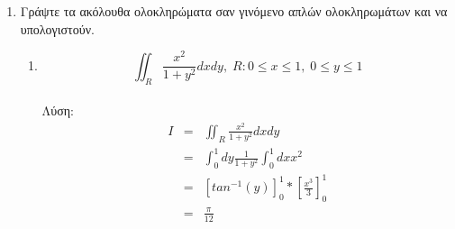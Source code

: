 \documentclass{article}
\begin{document}
{\begin{enumerate}
\begin{enumerate}{}
\item $$\iint _{R} xcos(x^2+y)dxdy,\;R:-\sqrt{\pi}\leq x\leq 0,\; 0\leq y \leq \pi$$ \\
Λύση:
\begin{eqnarray*}
I &=& \iint _{R} xcos(x^2+y) dxdy \\
& = & \int _{0} ^{\pi} dy \int_{-\sqrt{\pi}}^{0} dx xcos(x^2+y) \\
& = & \int _{0} ^{\pi} \left[ \frac{1}{2}sin(x^2+y) \right]^0_{-\sqrt{\pi}} dy\\
& = & \int _{0} ^{\pi} \frac{1}{2}sin(y)-\frac{1}{2}sin(\pi+y) dy\\
& = & \int _{0} ^{\pi} \frac{1}{2}sin(y)+\frac{1}{2}sin(y) dy\\
& = & \left[ -cos(y) \right]^{\pi}_{0}\\
& = & 2
\end{eqnarray*}

\item $$\iint _{R} x^2ye^{xy}dxdy,\;R:0\leq x\leq 1,\; 0\leq y \leq 2$$ \\
Λύση:
\begin{eqnarray*}
I &=& \iint _{R} x^2ye^{xy} dxdy \\
& = & \int _{0} ^{2} dy \int_{0}^{1} dx x^2ye^{xy} \\
Use\ factorial\ integration\ two\ times. \selectlanguage{english} & = & \int _{0} ^{2} dy\ y\int_{0}^{1} dx x^2e^{xy} \\
Evaluate\ the\ integral\ of\ each\ term. \selectlanguage{english} & = & \int _{0} ^{2} e^y-\frac{2e^y}{y}+\frac{2e^y-2}{y^2} dy \\
& = & 2
\end{eqnarray*}

\end{enumerate}


\item  Γράψτε τα ακόλουθα ολοκληρώματα σαν γινόμενο απλών ολοκληρωμάτων και να υπολογιστούν. 

\begin{enumerate}{}

\item $$\iint _{R} \frac{x^2}{1+y^2} dxdy,\;R:0\leq x\leq 1,\; 0\leq y \leq 1$$ \\
Λύση:
\begin{eqnarray*}
I &=& \iint _{R}\frac{x^2}{1+y^2} dxdy \\
& = & \int _{0} ^{1} dy \frac{1}{1+y^2} \int_{0}^{1} dx x^2 \\
& = & \left[ tan^{-1}(y) \right]^1_0*\left[ \frac{x^3}{3} \right]^1_0\\
& = & \frac{\pi}{12}
\end{eqnarray*}


\end{enumerate}
\end{enumerate}}
\end{document}
